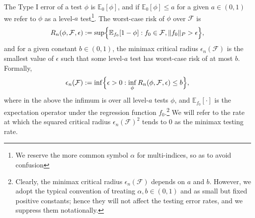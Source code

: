 \documentclass{article}
\newcommand{\1}{\mathbf{1}}
\newcommand{\mc}[1]{\mathcal{#1}}
\newcommand{\Ebb}{\mathbb{E}}
\theoremstyle{alden}
\theoremstyle{aldenthm}
\theoremstyle{definition}
\theoremstyle{remark}
\begin{document}
The Type I error of a test $\phi$ is $\mathbb{E}_0[\phi]$, and if $\mathbb{E}_0[\phi] \leq a$ for a given $a \in (0,1)$ we refer to $\phi$ as a level-$a$ test\footnote{We reserve the more common symbol $\alpha$ for multi-indices, so as to avoid confusion}. The worst-case risk of $\phi$ over $\mc{F}$ is
\begin{equation*}
R_n(\phi, \mc{F}, \epsilon) := \sup\Bigl\{\mathbb{E}_{f_0}[1 - \phi]: f_0 \in \mc{F}, \|f_0\|_{P} > \epsilon\Bigr\},
\end{equation*}
and for a given constant $b \in (0,1)$, the minimax critical radius $\epsilon_n(\mc{F})$ is the smallest value of $\epsilon$ such that some level-$a$ test has worst-case risk of at most $b$. Formally,
\begin{equation*}
\epsilon_n(\mc{F}) := \inf\Bigl\{\epsilon > 0: \inf_{\phi} R_n(\phi,\mc{F},\epsilon) \leq b \Bigr\},
\end{equation*} 
where in the above the infimum is over all level-$a$ tests $\phi$, and $\Ebb_{f_0}[\cdot]$ is the expectation operator under the regression function $f_0$.\footnote{Clearly, the minimax critical radius $\epsilon_n(\mc{F})$ depends on $a$ and $b$. However, we adopt the typical convention of treating $\alpha,b \in (0,1)$ and  as small but fixed positive constants; hence they will not affect the testing error rates, and we suppress them notationally.} We will refer to the rate at which the squared critical radius $\epsilon_n(\mc{F})^2$ tends to $0$ as the minimax testing rate.
\end{document}
